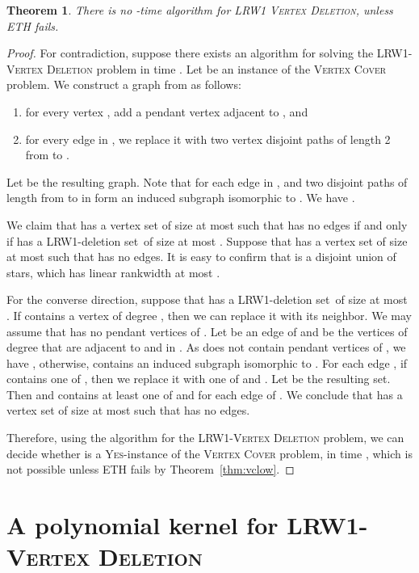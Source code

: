\documentclass[11pt]{article}
\newtheorem{theorem}{Theorem}[section]
\theoremstyle{remark}
\newcommand{\LRWD}{\textsc{LRW1-Vertex Deletion} }
\newcommand{\DEL}{LRW1-deletion set}
\newcommand{\YES}{\textsc{Yes}}
\begin{document}
\begin{theorem}
There is no -time algorithm for \textsc{LRW1 Vertex Deletion}, unless ETH fails.
\end{theorem}
\begin{proof}
For contradiction, suppose there exists an algorithm for solving the \LRWD problem in time .
Let  be an instance of the \textsc{Vertex Cover} problem.
We construct a graph  from  as follows:
\begin{enumerate}[(1)]
\item for every vertex , add a pendant vertex  adjacent to , and
\item  for every edge  in , we replace it with two vertex disjoint paths of length 2 from  to .
\end{enumerate}
Let  be the resulting graph. 
Note that for each edge  in , 
 and two disjoint paths of length  from  to  in  form an induced subgraph isomorphic to .
We have .


We claim that  has a vertex set  of size at most  such that  has no edges  if and only if  has a \DEL\ of size at most .
Suppose that  has a vertex set  of size at most  such that  has no edges.
It is easy to confirm that  is a disjoint union of stars, which has linear rankwidth at most .

For the converse direction, suppose that  has a \DEL\  of size at most . 
If  contains a vertex of degree , then we can replace it with its neighbor.
We may assume that  has no pendant vertices of .
Let  be an edge of  and  be the vertices of degree  that are adjacent to  and  in .
As  does not contain pendant vertices of , we have , otherwise,  contains an induced subgraph isomorphic to .
For each edge , if  contains one of , then we replace it with one of  and . Let  be the resulting set.
Then  and  contains at least one of  and  for each edge  of .
We conclude that  has a vertex set  of size at most  such that  has no edges.







Therefore, using the algorithm for the \LRWD problem, we can decide whether  is a \YES-instance of the \textsc{Vertex Cover} problem, in time , 
which is not possible unless ETH fails by Theorem~\ref{thm:vclow}.
\end{proof}


\section{A polynomial kernel for \textsc{LRW1-Vertex Deletion}}\label{sec:polykerthreaddel}
\end{document}
